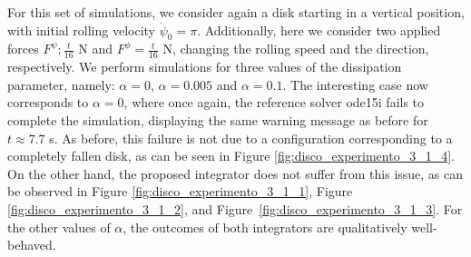 \documentclass{aims}
\numberwithin{equation}{section}
\theoremstyle{definition}
\begin{document}
\vskip 2mm
 For this set of simulations, we consider again a disk starting in a vertical position, with initial rolling velocity $\dot{\psi}_0 = \pi$. Additionally, here we consider two applied forces $F^\psi ; \frac{t}{16}$ N and $F^\phi = \frac{t}{16}$ N, changing the rolling speed and the direction, respectively. We perform simulations for three values of the dissipation parameter, namely: $\alpha = 0$, $\alpha = 0.005$ and $\alpha = 0.1$.
The interesting case now corresponds to $\alpha = 0$, where once again, the reference solver ode15i fails to complete the simulation, displaying the same warning message as before for $t \approx 7.7$ s. As before, this failure is not due to a configuration corresponding to a completely fallen disk, as can be seen in Figure \ref{fig:disco_experimento_3_1_4}. On the other hand, the proposed integrator does not suffer from this issue, as can be observed in Figure \ref{fig:disco_experimento_3_1_1}, Figure \ref{fig:disco_experimento_3_1_2}, and Figure~\ref{fig:disco_experimento_3_1_3}. For the other values of $\alpha$, the outcomes of both integrators are qualitatively well-behaved.
\end{document}

